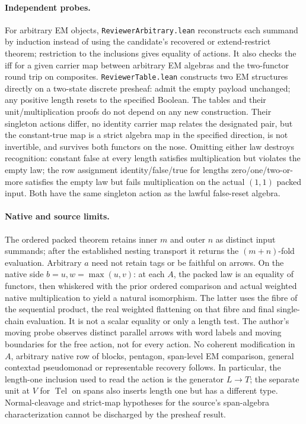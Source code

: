 \documentclass{article}
\begin{document}
\paragraph{Independent probes.} For arbitrary EM objects, \texttt{ReviewerArbitrary.lean} reconstructs each summand by induction instead of using the candidate's recovered or extend-restrict theorem; restriction to the inclusions gives equality of actions. It also checks the iff for a given carrier map between arbitrary EM algebras and the two-functor round trip on composites. \texttt{ReviewerTable.lean} constructs two EM structures directly on a two-state discrete presheaf: admit the empty payload unchanged; any positive length resets to the specified Boolean. The tables and their unit/multiplication proofs do not depend on any new construction. Their singleton actions differ, no identity carrier map relates the designated pair, but the constant-true map is a strict algebra map in the specified direction, is not invertible, and survives both functors on the nose. Omitting either law destroys recognition: constant false at every length satisfies multiplication but violates the empty law; the row assignment identity/false/true for lengths zero/one/two-or-more satisfies the empty law but fails multiplication on the actual $(1,1)$ packed input. Both have the same singleton action as the lawful false-reset algebra.
\paragraph{Native and source limits.} The ordered packed theorem retains inner $m$ and outer $n$ as distinct input summands; after the established nesting transport it returns the $(m+n)$-fold evaluation. Arbitrary $a$ need not retain tags or be faithful on arrows. On the native side $b=u,w=\max(u,v)$: at each $A$, the packed law is an equality of functors, then whiskered with the prior ordered comparison and actual weighted native multiplication to yield a natural isomorphism. The latter uses the fibre of the sequential product, the real weighted flattening on that fibre and final single-chain evaluation. It is not a scalar equality or only a length test. The author's moving probe observes distinct parallel arrows with word labels and moving boundaries for the free action, not for every action. No coherent modification in $A$, arbitrary native row of blocks, pentagon, span-level EM comparison, general contextad pseudomonad or representable recovery follows. In particular, the length-one inclusion used to read the action is the generator $L\to T$; the separate unit at $V$ for $\operatorname{Tel}$ on spans also inserts length one but has a different type. Normal-cleavage and strict-map hypotheses for the source's span-algebra characterization cannot be discharged by the presheaf result.
\end{document}
